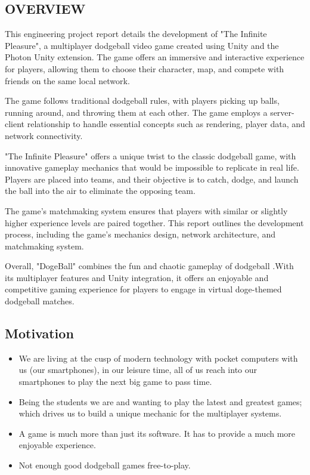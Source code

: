\documentclass[12pt]{report}
\begin{document}
\subsection{OVERVIEW}
\justifying
\setlength{\parindent}{3.7em}
\setlength{\parskip}{0.5em}
\renewcommand{\baselinestretch}{1.5}
\normalsize
\hspace{1.7cm}
This engineering project report details the development of "The Infinite Pleasure", a multiplayer dodgeball video game created using Unity and the Photon Unity extension. The game offers an immersive and interactive experience for players, allowing them to choose their character, map, and compete with friends on the same local network.

The game follows traditional dodgeball rules, with players picking up balls, running around, and throwing them at each other. The game employs a server-client relationship to handle essential concepts such as rendering, player data, and network connectivity.

"The Infinite Pleasure" offers a unique twist to the classic dodgeball game, with innovative gameplay mechanics that would be impossible to replicate in real life. Players are placed into teams, and their objective is to catch, dodge, and launch the ball into the air to eliminate the opposing team.

The game's matchmaking system ensures that players with similar or slightly higher experience levels are paired together. This report outlines the development process, including the game's mechanics design, network architecture, and matchmaking system.

Overall, "DogeBall" combines the fun and chaotic gameplay of dodgeball .With its multiplayer features and Unity integration, it offers an enjoyable and competitive gaming experience for players to engage in virtual doge-themed dodgeball matches.
\clearpage

\raggedright
\subsection{ Motivation}

\justifying
\setlength{\parindent}{4em}
\setlength{\parskip}{0.5em}
\renewcommand{\baselinestretch}{1.5}
\normalsize\hspace{1.7cm}\begin{itemize} \item We are living at the cusp of modern technology with pocket computers with us (our smartphones), in our leisure time, all of us reach into our smartphones to play the next big game to pass time.

\item Being the students we are and wanting to play the latest and greatest games; which drives us to build a unique mechanic for the multiplayer systems.

\item A game is much more than just its software. It has to provide a much more enjoyable experience.

\item Not enough good dodgeball games free-to-play.\\
\end{itemize}
\raggedright
\end{document}
